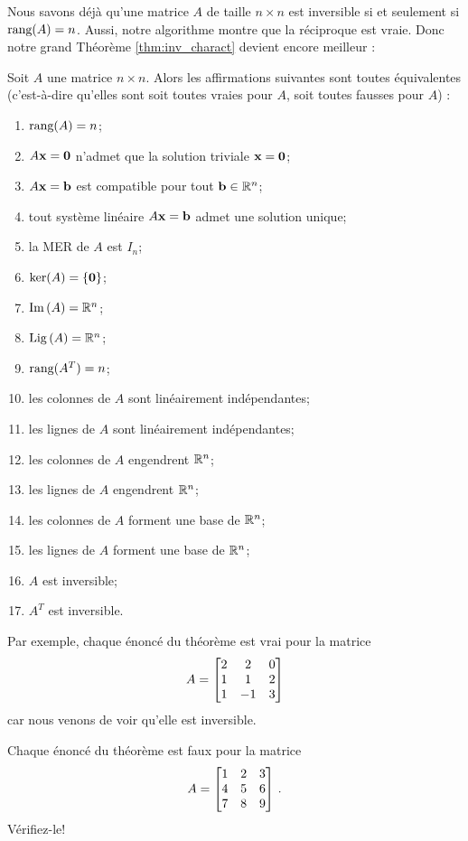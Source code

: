 Nous savons déjà qu'une matrice $A$ de taille $n\times n$ est inversible si et seulement si $\textrm{rang}(A)=n$.
Aussi, notre algorithme montre que la r\'eciproque est vraie.  Donc 
notre grand Théorème \ref{thm:inv_charact} devient encore meilleur :

\begin{theorem}
Soit $A$ une matrice $n \times n$.  Alors les affirmations suivantes
sont toutes équivalentes (c'est-à-dire qu'elles sont soit toutes vraies pour $A$, soit toutes
fausses pour $A$) :
\begin{enumerate}
\item $\textrm{rang}(A) = n$;
\item $A\mathbf{x}=\mathbf{0}$ n'admet que la solution triviale $\mathbf{x}=\mathbf{0}$;
\item $A\mathbf{x} = \mathbf{b}$ est compatible pour tout $\mathbf{b} \in \mathbb{R}^n$;
\item tout syst\`eme lin\'eaire $A\mathbf{x}=\mathbf{b}$ admet une solution unique;
\item la MER de $A$ est $I_n$;
\item $\ker(A) = \{\mathbf{0}\}$;
\item $\operatorname{Im}\,(A) = \mathbb{R}^n$;
\item $\operatorname{Lig\,}(A) = \mathbb{R}^n$;
\item $\textrm{rang}(A^T) = n$;
\item les colonnes de $A$ sont linéairement indépendantes;
\item les lignes de $A$ sont linéairement indépendantes;
\item les colonnes de $A$ engendrent $\mathbb{R}^n$;
\item les lignes de $A$ engendrent $\mathbb{R}^n$;
\item les colonnes de $A$ forment une base de $\mathbb{R}^n$;
\item les lignes de $A$ forment une base de $\mathbb{R}^n$;
\item $A$ est inversible;
\item $A^T$ est inversible.
\end{enumerate}
\end{theorem}

\begin{myexample} Par exemple, chaque énoncé du théorème est vrai pour la matrice
$$
A = \left[ \begin{matrix} 2 & 2 & 0 \\ 1 & 1 & 2\\ 1 & -1 & 3 \end{matrix} \right]
$$
car nous venons de voir qu'elle est inversible.
\end{myexample}

\begin{myexample} Chaque énoncé du théorème est faux pour la matrice
$$
A = \left[ \begin{matrix} 1 & 2 & 3\\ 4 & 5 & 6\\ 7 & 8 & 9 \end{matrix} \right]\,.
$$
V\'erifiez-le!
\end{myexample}

